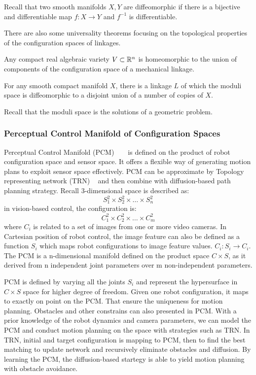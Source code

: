Recall that two smooth manifolds \(X, Y\) are diffeomorphic if there is a bijective and differentiable map \(f:X\to Y\) and \(f^{-1}\) is differentiable.

There are also some universality theorems focusing on the topological properties of the configuration spaces of linkages.

\begin{theorem}
  Any compact real algebraic variety \(V\subset \mathbb{R}^n\) is homeomorphic to the union of components of the configuration space of a mechanical linkage.
\end{theorem}

\begin{theorem}
  For any smooth compact manifold \(X\), there is a linkage \(L\) of which the moduli space is diffeomorphic to a disjoint union of a number of copies of \(X\).
\end{theorem}
Recall that the moduli space is the solutions of a geometric problem.

\subsubsection{Perceptual Control Manifold of Configuration Spaces}
Perceptual Control Manifold (PCM) ~\cite{zeller1997motion} ~\cite{sharma1997framework} is defined on the product of robot configuration space and sensor space. It offers a flexible way of generating motion plans to exploit sensor space effectively. PCM can be approximate by Topology representing network (TRN) ~\cite{martinetz1994topology} and then combine with diffusion-based path planning strategy. Recall 3-dimensional space is described as:
\[S^2_1\times S^2_2\times\dots\times S^2_n\]
in vision-based control, the configuration is:
\[C^2_1\times C^2_2\times\dots\times C^2_m\]
where \(C_i\) is related to a set of images from one or more video cameras. In Cartesian position of robot control, the image feature can also be defined as a function \(S_i\) which maps robot configurations to image feature values. \(C_i:S_i\rightarrow  C_i.\) The PCM is a n-dimensional manifold defined on the product space \(C \times S\), as it derived from n independent joint parameters over m non-independent parameters.

PCM is defined by varying all the joints \(S_i\) and  represent the hypersurface in  \(C \times S\) space for higher degree of freedom. Given one robot configuration, it maps to exactly on point on the PCM. That ensure the uniqueness for motion planning. Obstacles and other constrains can also presented in PCM. With a prior knowledge of the robot dynamics and camera parameters, we can model the PCM and conduct motion planning on the space with strategies such as TRN. In TRN, initial and target configuration is mapping to PCM, then to find the best matching to update network and recursively eliminate obstacles and diffusion. By learning the PCM, the diffusion-based startegy is able to yield motion planning with obstacle avoidance.


